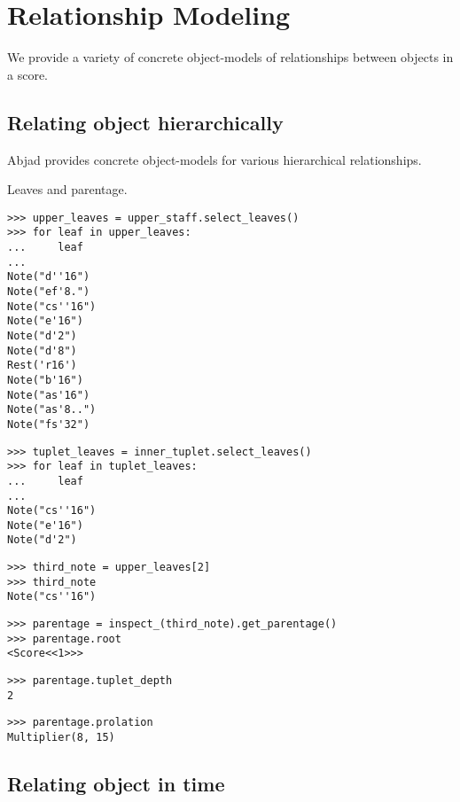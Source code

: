 \section{Relationship Modeling}\label{sec:relationship_modeling}

We provide a variety of concrete object-models of relationships between objects
in a score.


\subsection{Relating object hierarchically}

Abjad provides concrete object-models for various hierarchical relationships.

Leaves and parentage.

\begin{lstlisting}
>>> upper_leaves = upper_staff.select_leaves()
>>> for leaf in upper_leaves:
...     leaf
... 
Note("d''16")
Note("ef'8.")
Note("cs''16")
Note("e'16")
Note("d'2")
Note("d'8")
Rest('r16')
Note("b'16")
Note("as'16")
Note("as'8..")
Note("fs'32")
\end{lstlisting}


\begin{lstlisting}
>>> tuplet_leaves = inner_tuplet.select_leaves()
>>> for leaf in tuplet_leaves:
...     leaf
... 
Note("cs''16")
Note("e'16")
Note("d'2")
\end{lstlisting}


\begin{lstlisting}
>>> third_note = upper_leaves[2]
>>> third_note
Note("cs''16")
\end{lstlisting}


\begin{lstlisting}
>>> parentage = inspect_(third_note).get_parentage()
>>> parentage.root
<Score<<1>>>
\end{lstlisting}


\begin{lstlisting}
>>> parentage.tuplet_depth
2
\end{lstlisting}


\begin{lstlisting}
>>> parentage.prolation
Multiplier(8, 15)
\end{lstlisting}


\subsection{Relating object in time}

